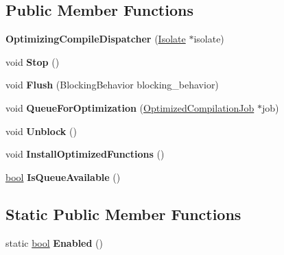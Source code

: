 \subsection*{Public Member Functions}
\begin{DoxyCompactItemize}
\item 
\mbox{\label{classv8_1_1internal_1_1OptimizingCompileDispatcher_ab800eba82ee31785da6ea1adddeec0be}} 
{\bfseries Optimizing\+Compile\+Dispatcher} (\mbox{\hyperlink{classv8_1_1internal_1_1Isolate}{Isolate}} $\ast$isolate)
\item 
\mbox{\label{classv8_1_1internal_1_1OptimizingCompileDispatcher_a8b5292a016e4a78386d021b00a40204d}} 
void {\bfseries Stop} ()
\item 
\mbox{\label{classv8_1_1internal_1_1OptimizingCompileDispatcher_a3482c1a41548633dc036c0aea4ba6cbb}} 
void {\bfseries Flush} (Blocking\+Behavior blocking\+\_\+behavior)
\item 
\mbox{\label{classv8_1_1internal_1_1OptimizingCompileDispatcher_a722e1b766c9c4553155305f42b49a22c}} 
void {\bfseries Queue\+For\+Optimization} (\mbox{\hyperlink{classv8_1_1internal_1_1OptimizedCompilationJob}{Optimized\+Compilation\+Job}} $\ast$job)
\item 
\mbox{\label{classv8_1_1internal_1_1OptimizingCompileDispatcher_a4921c7b2bc74aa8ed5fe59935bfe1295}} 
void {\bfseries Unblock} ()
\item 
\mbox{\label{classv8_1_1internal_1_1OptimizingCompileDispatcher_a6a2f2d6c43028b6474396c576df12083}} 
void {\bfseries Install\+Optimized\+Functions} ()
\item 
\mbox{\label{classv8_1_1internal_1_1OptimizingCompileDispatcher_aa067df152012a6dfb1a33ca7b0ce4e01}} 
\mbox{\hyperlink{classbool}{bool}} {\bfseries Is\+Queue\+Available} ()
\end{DoxyCompactItemize}
\subsection*{Static Public Member Functions}
\begin{DoxyCompactItemize}
\item 
\mbox{\label{classv8_1_1internal_1_1OptimizingCompileDispatcher_a5242d544a43212fa6496ef4e3441b050}} 
static \mbox{\hyperlink{classbool}{bool}} {\bfseries Enabled} ()
\end{DoxyCompactItemize}



